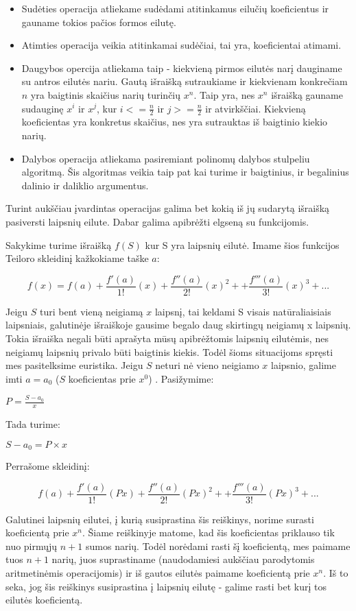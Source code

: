 	\begin{itemize}
		\item Sudėties operacija atliekame sudėdami atitinkamus eilučių koeficientus ir gauname tokios pačios formos eilutę.
		\item Atimties operacija veikia atitinkamai sudėčiai, tai yra, koeficientai atimami.
		\item Daugybos opercija atliekama taip - kiekvieną pirmos eilutės narį dauginame su antros eilutės nariu.
			  Gautą išraišką sutraukiame ir kiekvienam konkrečiam $n$ yra baigtinis skaičius narių turinčių $x^n$.
			  Taip yra, nes $x^n$ išraišką gauname sudauginę $x^i$ ir $x^j$, kur $i <= \frac{n}{2}$ ir $j >= \frac{n}{2}$ ir atvirkščiai.
			  Kiekvieną koeficientas yra konkretus skaičius, nes yra sutrauktas iš baigtinio kiekio narių.
		\item Dalybos operacija atliekama pasiremiant polinomų dalybos stulpeliu algoritmą. 
			  Šis algoritmas veikia taip pat kai turime ir baigtinius, ir begalinius dalinio ir daliklio argumentus.
	\end{itemize}
	
	Turint aukščiau įvardintas operacijas galima bet kokią iš jų sudarytą išraišką pasiversti laipsnių eilute.
	Dabar galima apibrėžti elgseną su funkcijomis.
	
	Sakykime turime išraišką $f(S)$ kur S yra laipsnių eilutė. 
	Imame šios funkcijos Teiloro skleidinį kažkokiame taške $a$: 
	
	\[f(x) = f(a) + \frac{f'(a)}{1!}(x)+\frac{f''(a)}{2!}(x)^2 + +\frac{f'''(a)}{3!}(x)^3 + ...\]
	
	Jeigu $S$ turi bent vieną neigiamą $x$ laipsnį, tai keldami S visais natūraliaisiais laipsniais, galutinėje išraiškoje gausime begalo daug skirtingų neigiamų x laipsnių.
	Tokia išraiška negali būti aprašyta mūsų apibrėžtomis laipsnių eilutėmis, nes neigiamų laipsnių privalo būti baigtinis kiekis. 
	Todėl šioms situacijoms spręsti mes pasitelksime euristika.
	Jeigu $S$ neturi nė vieno neigiamo $x$ laipsnio, galime imti $a = a_0$ ($S$ koeficientas prie $x^0$) .
	Pasižymime:
	
	$P = \frac{S - a_0}{x}$
	
	Tada turime: 
	
	$S - a_0 = P \times x$
	
	Perrašome skleidinį:
	
	\[f(a) + \frac{f'(a)}{1!}(Px)+\frac{f''(a)}{2!}(Px)^2 + +\frac{f'''(a)}{3!}(Px)^3 + ...\]
	
	Galutinei laipsnių eilutei, į kurią susiprastina šis reiškinys, norime surasti koeficientą prie $x^n$. 
	Šiame reiškinyje matome, kad šis koeficientas priklauso tik nuo pirmųjų $n+1$ sumos narių. 
	Todėl norėdami rasti šį koeficientą, mes paimame tuos $n+1$ narių, juos suprastiname (naudodamiesi aukščiau parodytomis aritmetinėmis operacijomis) 
	ir iš gautos eilutės paimame koeficientą prie $x^n$. 
	Iš to seka, jog šis reiškinys susiprastina į laipsnių eilutę - galime rasti bet kurį tos eilutės koeficientą.
	
